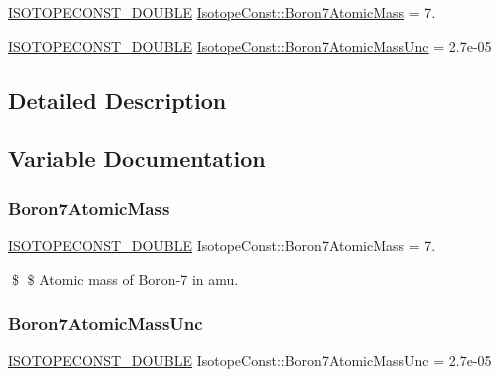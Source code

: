 \begin{DoxyCompactItemize}
\item 
\mbox{\hyperlink{group___isotope_const-_macros_ga8f45a7272ce02c0b4c65c44636ed719a}{I\+S\+O\+T\+O\+P\+E\+C\+O\+N\+S\+T\+\_\+\+D\+O\+U\+B\+LE}} \mbox{\hyperlink{group___isotope_const-_boron-_b7_gae9709e31e98f315f1e0c7f4e981dd018}{Isotope\+Const\+::\+Boron7\+Atomic\+Mass}} = 7.
\item 
\mbox{\hyperlink{group___isotope_const-_macros_ga8f45a7272ce02c0b4c65c44636ed719a}{I\+S\+O\+T\+O\+P\+E\+C\+O\+N\+S\+T\+\_\+\+D\+O\+U\+B\+LE}} \mbox{\hyperlink{group___isotope_const-_boron-_b7_ga26377792abdf57526fae02ed0b0968e1}{Isotope\+Const\+::\+Boron7\+Atomic\+Mass\+Unc}} = 2.\+7e-\/05
\end{DoxyCompactItemize}


\subsection{Detailed Description}


\subsection{Variable Documentation}
\mbox{\label{group___isotope_const-_boron-_b7_gae9709e31e98f315f1e0c7f4e981dd018}} 
\subsubsection{\texorpdfstring{Boron7\+Atomic\+Mass}{Boron7AtomicMass}}
{\footnotesize\ttfamily \mbox{\hyperlink{group___isotope_const-_macros_ga8f45a7272ce02c0b4c65c44636ed719a}{I\+S\+O\+T\+O\+P\+E\+C\+O\+N\+S\+T\+\_\+\+D\+O\+U\+B\+LE}} Isotope\+Const\+::\+Boron7\+Atomic\+Mass = 7.}

\$ \$ Atomic mass of Boron-\/7 in amu. \mbox{\label{group___isotope_const-_boron-_b7_ga26377792abdf57526fae02ed0b0968e1}} 
\subsubsection{\texorpdfstring{Boron7\+Atomic\+Mass\+Unc}{Boron7AtomicMassUnc}}
{\footnotesize\ttfamily \mbox{\hyperlink{group___isotope_const-_macros_ga8f45a7272ce02c0b4c65c44636ed719a}{I\+S\+O\+T\+O\+P\+E\+C\+O\+N\+S\+T\+\_\+\+D\+O\+U\+B\+LE}} Isotope\+Const\+::\+Boron7\+Atomic\+Mass\+Unc = 2.\+7e-\/05}

